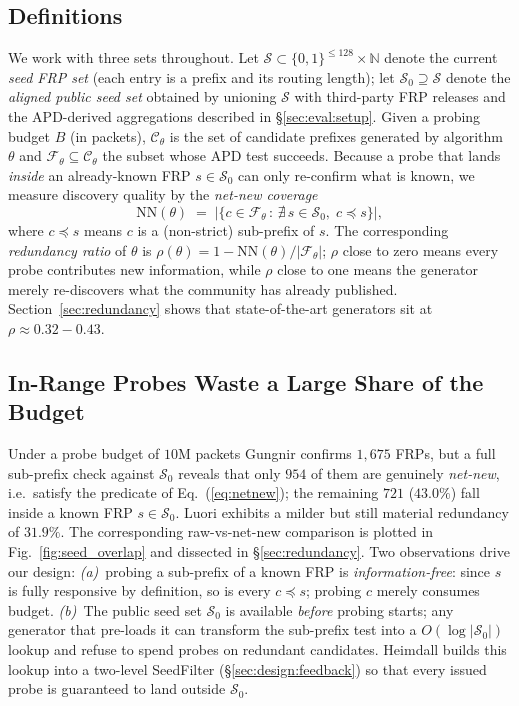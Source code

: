 \documentclass[conference]{IEEEtran}
\begin{document}
\subsection{Definitions}
\label{sec:motivation:def}
We work with three sets throughout.  Let
$\mathcal{S}\subset\{0,1\}^{\le128}\times\mathbb{N}$ denote the
current \emph{seed FRP set} (each entry is a prefix and its
routing length); let $\mathcal{S}_{0}\supseteq\mathcal{S}$
denote the \emph{aligned public seed set} obtained by unioning
$\mathcal{S}$ with third-party FRP releases and the APD-derived
aggregations described in \S\ref{sec:eval:setup}.  Given a
probing budget $B$ (in packets), $\mathcal{C}_\theta$ is the set
of candidate prefixes generated by algorithm $\theta$ and
$\mathcal{F}_\theta\!\subseteq\!\mathcal{C}_\theta$ the subset
whose APD test succeeds.  Because a probe that lands
\emph{inside} an already-known FRP $s\!\in\!\mathcal{S}_{0}$ can
only re-confirm what is known, we measure discovery quality by
the \emph{net-new coverage}
\begin{equation}
\mathrm{NN}(\theta) \;=\;
\big|\{c\in\mathcal{F}_\theta \,:\, \nexists\,s\in\mathcal{S}_{0},\;
   c\preceq s\}\big|,
\label{eq:netnew}
\end{equation}
where $c\preceq s$ means $c$ is a (non-strict) sub-prefix of $s$.
The corresponding \emph{redundancy ratio} of $\theta$ is
$\rho(\theta)\!=\!1-\mathrm{NN}(\theta)/|\mathcal{F}_\theta|$;
$\rho$ close to zero means every probe contributes new
information, while $\rho$ close to one means the generator merely
re-discovers what the community has already published.
Section~\ref{sec:redundancy} shows that state-of-the-art
generators sit at $\rho\!\approx\!0.32\!-\!0.43$.

\subsection{In-Range Probes Waste a Large Share of the Budget}
Under a probe budget of $10$M packets Gungnir confirms $1{,}675$
FRPs, but a full sub-prefix check against $\mathcal{S}_{0}$
reveals that only $954$ of them are genuinely
\emph{net-new}, i.e.\ satisfy the predicate of
Eq.~(\ref{eq:netnew}); the remaining $721$ ($43.0\%$) fall inside
a known FRP $s\!\in\!\mathcal{S}_{0}$.  Luori exhibits a milder
but still material redundancy of $31.9\%$.  The corresponding
raw-vs-net-new comparison is plotted in
Fig.~\ref{fig:seed_overlap} and dissected in
\S\ref{sec:redundancy}.  Two observations drive our design:
\emph{(a)}~probing a sub-prefix of a known FRP is
\emph{information-free}: since $s$ is fully responsive by
definition, so is every $c\preceq s$; probing $c$ merely
consumes budget.
\emph{(b)}~The public seed set $\mathcal{S}_{0}$ is available
\emph{before} probing starts; any generator that pre-loads it
can transform the sub-prefix test into a $O(\log|\mathcal{S}_{0}|)$
lookup and refuse to spend probes on redundant candidates.
Heimdall builds this lookup into a two-level SeedFilter
(\S\ref{sec:design:feedback}) so that every issued probe is
guaranteed to land outside $\mathcal{S}_{0}$.
\end{document}
